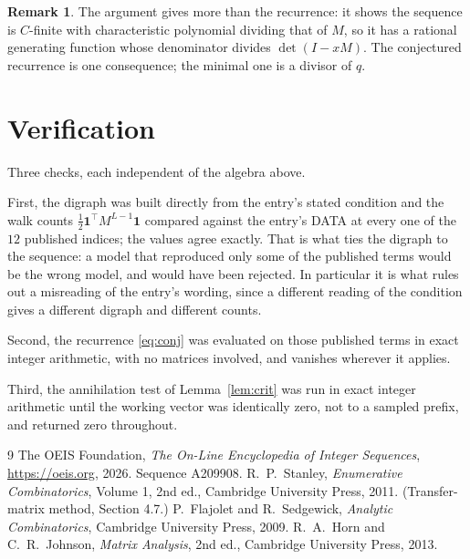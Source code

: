 \documentclass[11pt,a4paper]{article}
\theoremstyle{plain}
\theoremstyle{definition}
\newtheorem{remark}[theorem]{Remark}
\begin{document}
\begin{remark}
The argument gives more than the recurrence: it shows the sequence is $C$-finite with
characteristic polynomial dividing that of $M$, so it has a rational generating function
whose denominator divides $\det(I-xM)$. The conjectured recurrence is one consequence; the
minimal one is a divisor of $q$.
\end{remark}

\section{Verification}

Three checks, each independent of the algebra above.

First, the digraph was built directly from the entry's stated condition and the walk counts
$\tfrac1{2}\mathbf{1}^{\!\top}M^{L-1}\mathbf{1}$ compared against the entry's DATA at
every one of the $12$ published indices; the values agree exactly. That is what ties
the digraph to the sequence: a model that reproduced only some of the published terms would
be the wrong model, and would have been rejected. In particular it is what rules out a
misreading of the entry's wording, since a different reading of the condition gives a
different digraph and different counts.

Second, the recurrence \eqref{eq:conj} was evaluated on those published terms in exact
integer arithmetic, with no matrices involved, and vanishes wherever it applies.

Third, the annihilation test of Lemma~\ref{lem:crit} was run in exact integer arithmetic
until the working vector was identically zero, not to a sampled prefix, and returned zero
throughout.

\begin{thebibliography}{9}
 The OEIS Foundation, \emph{The On-Line Encyclopedia of Integer
Sequences}, \url{https://oeis.org}, 2026. Sequence A209908.
 R.~P.~Stanley, \emph{Enumerative Combinatorics}, Volume 1, 2nd ed.,
Cambridge University Press, 2011. (Transfer-matrix method, Section 4.7.)
 P.~Flajolet and R.~Sedgewick, \emph{Analytic Combinatorics}, Cambridge
University Press, 2009.
 R.~A.~Horn and C.~R.~Johnson, \emph{Matrix Analysis}, 2nd ed., Cambridge
University Press, 2013.
\end{thebibliography}
\end{document}
